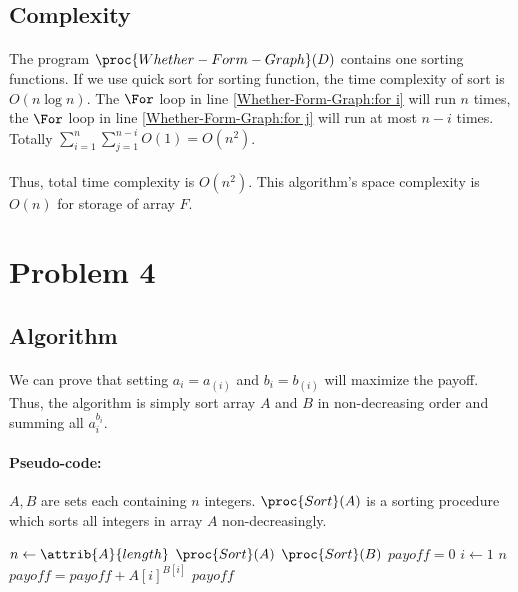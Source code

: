 \documentclass[]{article}
\begin{document}
        \subsection{Complexity}
            \paragraph{}The program $\proc{Whether-Form-Graph}(D)$ contains one sorting functions. If we use quick sort for sorting function, the time complexity of sort is $O(n\log n)$. The $\For$ loop in line \ref{Whether-Form-Graph:for i} will run $n$ times, the $\For$ loop in line \ref{Whether-Form-Graph:for j} will run at most $n-i$ times. Totally $\sum_{i=1}^n{\sum_{j=1}^{n-i}O(1)} = O(n^2)$. 
            \paragraph{}Thus, total time complexity is $O(n^2)$. This algorithm's space complexity is $O(n)$ for storage of array $F$.            

    \section{Problem 4}
        \subsection{Algorithm}
        \paragraph{}We can prove that setting $a_i = a_{(i)}$ and $b_i = b_{(i)}$ will maximize the payoff. Thus, the algorithm is simply sort array $A$ and $B$ in non-decreasing order and summing all $a_i^{b_i}$.
        \paragraph{Pseudo-code:}$A,B$ are sets each containing $n$ integers. $\proc{Sort}(A)$ is a sorting procedure which sorts all integers in array $A$ non-decreasingly.
        \begin{codebox}
\li $n \gets \attrib{A}{length}$
\li $\proc{Sort}(A)$
\li $\proc{Sort}(B)$
\li $payoff = 0$
\li \For $i \gets 1$ \To $n$
\li     \Do
            $payoff = payoff + A[i]^{B[i]}$
        \End 
\li \Return $payoff$
        \end{codebox}
\end{document}
